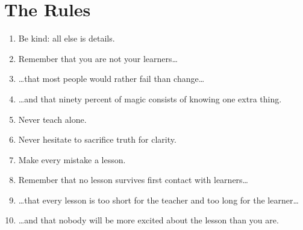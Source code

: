 \chapter*{The Rules}

\begin{enumerate}

\item Be kind: all else is details.\\

\item Remember that you are not your learners{\ldots}\\

\item {\ldots}that most people would rather fail than change{\ldots}\\

\item {\ldots}and that ninety percent of magic consists of knowing one extra thing.\\

\item Never teach alone.\\

\item Never hesitate to sacrifice truth for clarity.\\

\item Make every mistake a lesson.\\

\item Remember that no lesson survives first contact with learners{\ldots}\\

\item {\ldots}that every lesson is too short for the teacher and too long for the learner{\ldots}\\

\item {\ldots}and that nobody will be more excited about the lesson than you are.

\end{enumerate}
